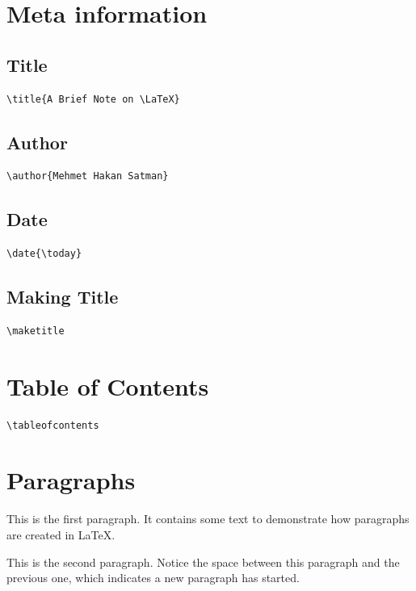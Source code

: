 \documentclass[12pt]{article}
\begin{document}
\section{Meta information}

\subsection{Title}
\begin{verbatim}
\title{A Brief Note on \LaTeX}
\end{verbatim}

\subsection{Author}
\begin{verbatim}
\author{Mehmet Hakan Satman}
\end{verbatim}

\subsection{Date}
\begin{verbatim}
\date{\today}
\end{verbatim}

\subsection{Making Title}
\begin{verbatim}
\maketitle
\end{verbatim}

\section{Table of Contents}
\begin{verbatim}
\tableofcontents
\end{verbatim}


\section{Paragraphs}

This is the first paragraph. It contains some text to 
demonstrate how paragraphs are created in \LaTeX.

This is the second paragraph. Notice the space between 
this paragraph and the previous one, which indicates a new paragraph has started.
\end{document}
